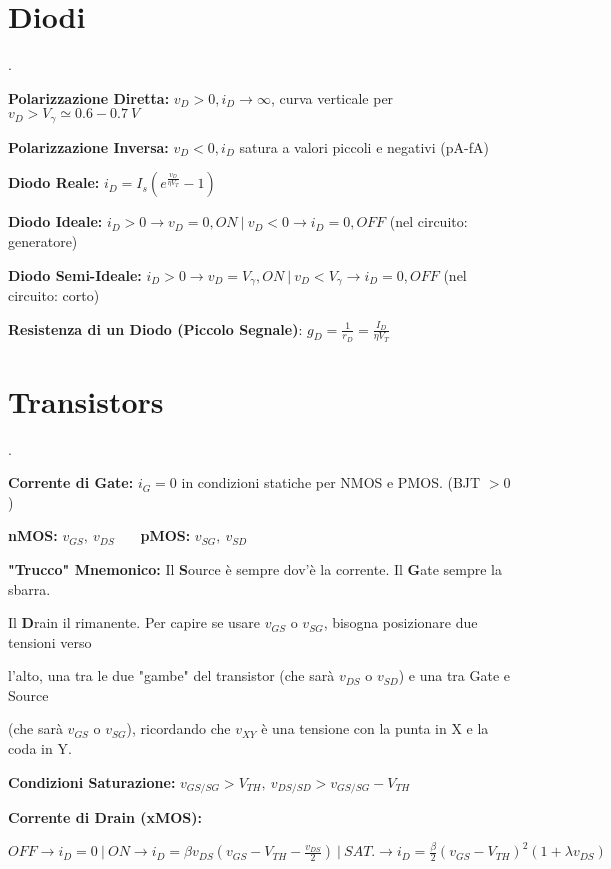 \documentclass[12pt]{extarticle}
\begin{document}
\section{Diodi}.

{\bf Polarizzazione Diretta:} $\displaystyle v_D > 0, i_D \to \infty $, curva verticale per $v_D > V_\gamma \simeq 0.6-0.7 \ V$

{\bf Polarizzazione Inversa:} $\displaystyle v_D < 0, i_D$ satura a valori piccoli e negativi (pA-fA)

{\bf Diodo Reale:} $\displaystyle i_D = I_s(e^{\frac{v_D}{\eta V_T}}- 1)$

{\bf Diodo Ideale:} $i_D > 0 \to v_D = 0, ON \ \big | \ v_D < 0 \to i_D = 0, OFF $ (nel circuito: generatore)

{\bf Diodo Semi-Ideale:} $i_D > 0 \to v_D = V_\gamma, ON \ \big | \ v_D < V_\gamma \to i_D = 0, OFF$ (nel circuito: corto)

{\bf Resistenza di un Diodo (Piccolo Segnale)}: $\displaystyle g_D = \frac{1}{r_D} = \frac{I_D}{\eta V_T}$

\section{Transistors}.

{\bf Corrente di Gate:} $i_G = 0$ in condizioni statiche per NMOS e PMOS. (BJT $> 0$)

{\bf nMOS:} $\displaystyle v_{GS}, \ v_{DS}$ \ \ \ {\bf pMOS:} $\displaystyle v_{SG}, \ v_{SD}$

{\bf "Trucco" Mnemonico:} Il {\bf S}ource è sempre dov'è la corrente. Il {\bf G}ate sempre la sbarra.

Il {\bf D}rain il rimanente. Per capire se usare $v_{GS}$ o $v_{SG}$, bisogna posizionare due tensioni verso

l'alto, una tra le due "gambe" del transistor (che sarà $v_{DS}$ o $v_{SD}$) e una tra Gate e Source

(che sarà $v_{GS}$ o $v_{SG}$), ricordando che $v_{XY}$ è una tensione con la punta in X e la coda in Y.

{\bf Condizioni Saturazione:} $\displaystyle v_{GS/SG} > V_{TH}, \ v_{DS/SD} > v_{GS/SG} - V_{TH} $

{\bf Corrente di Drain (xMOS):} 

$\displaystyle OFF \to i_D = 0 \ \big | \  ON \to i_D = \beta v_{DS}(v_{GS}-V_{TH}-\frac{v_{DS}}{2}) \ \big | \ SAT. \to i_D = \frac{\beta}{2}(v_{GS}-V_{TH})^2(1+\lambda v_{DS})$
\end{document}
